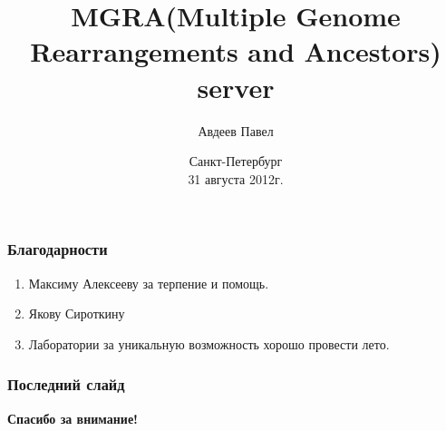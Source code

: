 \documentclass[10pt,pdf,hyperref={unicode}]{beamer}
\title{MGRA(Multiple Genome Rearrangements and Ancestors) server}
\author{Авдеев Павел}
\institute{Algorithmic Biology Lab \\
    \vspace{0.7cm}
    Руководитель:  Максим Алексеев \\
    \vspace{0.7cm}
}
\date{
    Санкт-Петербург\\
    31 августа 2012г.
}
\begin{document}
\begin{frame}
  \maketitle
\end{frame}

\begin{frame}
	\begin{center}
	\end{center}
\end{frame}

\begin{frame}
	\frametitle{Благодарности}
	\begin{enumerate}
		\item Максиму Алексееву за терпение и помощь.
		\item Якову Сироткину
		\item Лаборатории за уникальную возможность хорошо провести лето.
	\end{enumerate}
\end{frame}

\begin{frame}
	\frametitle{Последний слайд}
	\begin{center}
		\Huge{\textbf{Спасибо за внимание!}}
	\end{center}
\end{frame}
\end{document}
